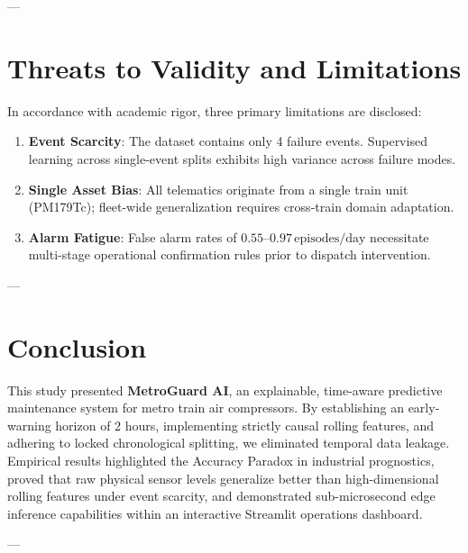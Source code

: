 \documentclass[10pt,twocolumn,a4paper]{article}
\begin{document}
---

\section{Threats to Validity and Limitations}
In accordance with academic rigor, three primary limitations are disclosed:
\begin{enumerate}
    \item \textbf{Event Scarcity}: The dataset contains only 4 failure events. Supervised learning across single-event splits exhibits high variance across failure modes.
    \item \textbf{Single Asset Bias}: All telematics originate from a single train unit (PM179Tc); fleet-wide generalization requires cross-train domain adaptation.
    \item \textbf{Alarm Fatigue}: False alarm rates of $0.55$--$0.97\,\text{episodes/day}$ necessitate multi-stage operational confirmation rules prior to dispatch intervention.
\end{enumerate}

---

\section{Conclusion}
This study presented \textbf{MetroGuard AI}, an explainable, time-aware predictive maintenance system for metro train air compressors. By establishing an early-warning horizon of 2 hours, implementing strictly causal rolling features, and adhering to locked chronological splitting, we eliminated temporal data leakage. Empirical results highlighted the Accuracy Paradox in industrial prognostics, proved that raw physical sensor levels generalize better than high-dimensional rolling features under event scarcity, and demonstrated sub-microsecond edge inference capabilities within an interactive Streamlit operations dashboard.

---
\end{document}
